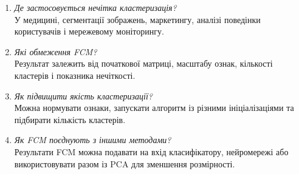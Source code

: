 \documentclass[12pt,a4paper]{article}
\begin{document}
\begin{enumerate}[leftmargin=*]
\item \textit{Де застосовується нечітка кластеризація?}\\
У медицині, сегментації зображень, маркетингу, аналізі поведінки користувачів і мережевому моніторингу.
\item \textit{Які обмеження FCM?}\\
Результат залежить від початкової матриці, масштабу ознак, кількості кластерів і показника нечіткості.
\item \textit{Як підвищити якість кластеризації?}\\
Можна нормувати ознаки, запускати алгоритм із різними ініціалізаціями та підбирати кількість кластерів.
\item \textit{Як FCM поєднують з іншими методами?}\\
Результати FCM можна подавати на вхід класифікатору, нейромережі або використовувати разом із PCA для зменшення розмірності.
\end{enumerate}
\end{document}
